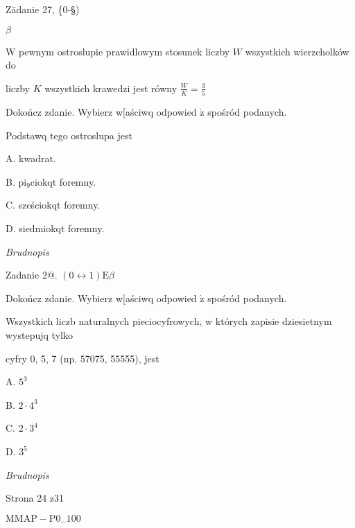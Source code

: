 \documentclass[a4paper,12pt]{article}
\begin{document}
Zädanie 27, \{0-\S)

$\beta$

$\mathrm{W}$ pewnym ostroslupie prawidlowym stosunek liczby $W$ wszystkich wierzcholków do

liczby $K$ wszystkich krawedzi jest równy $\displaystyle \frac{W}{K}=\frac{3}{5}$

Dokończ zdanie. Wybierz w[aściwq odpowied $\acute{\mathrm{z}}$ spośród podanych.

Podstawq tego ostroslupa jest

A. kwadrat.

B. $\mathrm{p}\mathrm{i}_{9}$ciokqt foremny.

C. sześciokqt foremny.

D. siedmiokqt foremny.

{\it Brudnopis}

Zadanie 2@. $(0\leftrightarrow 1) \mathrm{E} \beta$

Dokończ zdanie. Wybierz w[aściwq odpowied $\acute{\mathrm{z}}$ spośród podanych.

Wszystkich liczb naturalnych pieciocyfrowych, w których zapisie dziesietnym wystepujq tylko

cyfry 0, 5, 7 (np. 57075, 55555), jest

A. $5^{3}$

B. $2\cdot 4^{3}$

C. $2\cdot 3^{4}$

D. $3^{5}$

{\it Brudnopis}

Strona 24 z31

$\mathrm{M}\mathrm{M}\mathrm{A}\mathrm{P}-\mathrm{P}0_{-}100$
\end{document}
